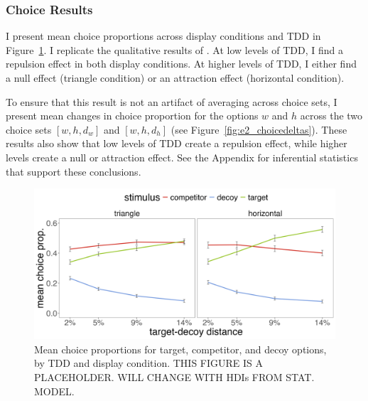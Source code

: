 \subsubsection{Choice Results}

I present mean choice proportions across display conditions and TDD in Figure~\ref{fig:e2_choiceprops}. I replicate the qualitative results of \textcite{spektorWhenGoodLooks2018b}. At low levels of TDD, I find a repulsion effect in both display conditions. At higher levels of TDD, I either find a null effect (triangle condition) or an attraction effect (horizontal condition). 

To ensure that this result is not an artifact of averaging across choice sets, I present mean changes in choice proportion for the options $w$ and $h$ across the two choice sets $[w,h,d_{w}]$ and $[w,h,d_{h}]$ (see Figure~\ref{fig:e2_choicedeltas}). These results also show that low levels of TDD create a repulsion effect, while higher levels create a null or attraction effect. See the Appendix for inferential statistics that support these conclusions.

\begin{figure}
   \includegraphics[width=\textwidth]{figures/choicePhase_att_trials_mean_choice_props_collapsed.jpg}
   \caption{Mean choice proportions for target, competitor, and decoy options, by TDD and display condition. THIS FIGURE IS A PLACEHOLDER. WILL CHANGE WITH HDIs FROM STAT. MODEL.}
   \label{fig:e2_choiceprops}
\end{figure}

